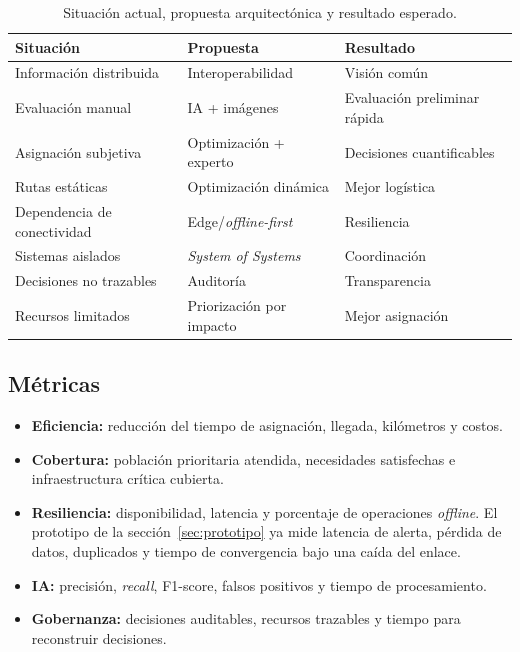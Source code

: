 \documentclass[11pt,a4paper]{article}
\begin{document}
\begin{table}[htbp]
\centering
\caption{Situación actual, propuesta arquitectónica y resultado esperado.}
\label{tab:contribucion}
\begin{tabularx}{\textwidth}{@{}LLL@{}}
\toprule
\textbf{Situación} & \textbf{Propuesta} & \textbf{Resultado} \\
\midrule
Información distribuida     & Interoperabilidad        & Visión común \\
Evaluación manual           & IA + imágenes            & Evaluación preliminar rápida \\
Asignación subjetiva        & Optimización + experto   & Decisiones cuantificables \\
Rutas estáticas             & Optimización dinámica    & Mejor logística \\
Dependencia de conectividad & Edge/\emph{offline-first} & Resiliencia \\
Sistemas aislados           & \emph{System of Systems} & Coordinación \\
Decisiones no trazables     & Auditoría                & Transparencia \\
Recursos limitados          & Priorización por impacto & Mejor asignación \\
\bottomrule
\end{tabularx}
\end{table}

\subsection{Métricas}
\label{sec:metricas}

\begin{itemize}[leftmargin=*]
  \item \textbf{Eficiencia:} reducción del tiempo de asignación, llegada,
        kilómetros y costos.
  \item \textbf{Cobertura:} población prioritaria atendida, necesidades
        satisfechas e infraestructura crítica cubierta.
  \item \textbf{Resiliencia:} disponibilidad, latencia y porcentaje de
        operaciones \emph{offline}. El prototipo de la
        sección~\ref{sec:prototipo} ya mide latencia de alerta, pérdida de
        datos, duplicados y tiempo de convergencia bajo una caída del enlace.
  \item \textbf{IA:} precisión, \emph{recall}, F1-score, falsos positivos y
        tiempo de procesamiento.
  \item \textbf{Gobernanza:} decisiones auditables, recursos trazables y
        tiempo para reconstruir decisiones.
\end{itemize}
\end{document}
